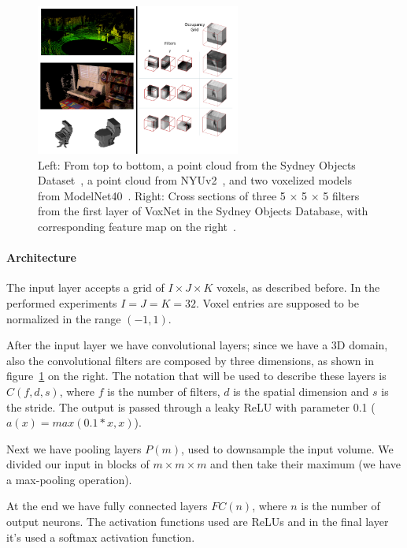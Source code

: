 \begin{figure}[ht]
    \centering
    \captionsetup{width=.91\linewidth}
    \includegraphics[width=0.6\textwidth]{images/VOLUM_cloud_filtpng.png}
    \caption{Left: From top to bottom, a point cloud from the Sydney Objects Dataset~\cite{dataset_ICRA2012},
a point cloud from NYUv2~\cite{dataset_ECCV2012}, and two voxelized models from ModelNet40~\cite{ShapeNets}.
Right: Cross sections of three 5 × 5 × 5 filters from the first layer of VoxNet in the Sydney Objects Database, with corresponding feature map on the right~\cite{VoxNet}.}
    \label{fig:VOLUM_cloud_filtpng}
\end{figure}

\paragraph{Architecture}
The input layer accepts a grid of $I \times J \times K$ voxels, as described before. In the performed experiments $I = J = K = 32$. Voxel entries are supposed to be normalized in the range $(-1,1)$.

After the input layer we have convolutional layers; since we have a 3D domain, also the convolutional filters are composed by three dimensions, as shown in figure~\ref{fig:VOLUM_cloud_filtpng} on the right. The notation that will be used to describe these layers is $C(f,d,s)$, where $f$ is the number of filters, $d$ is the spatial dimension and $s$ is the stride. The output is passed through a leaky ReLU with parameter 0.1  ($a(x)=max(0.1*x , x)$).

Next we have pooling layers $P(m)$, used to downsample the input volume. We divided our input in blocks of $m \times m \times m$ and then take their maximum (we have a max-pooling operation).

At the end we have fully connected layers $FC(n)$, where $n$ is the number of output neurons. The activation functions used are ReLUs and in the final layer it's used a softmax activation function.

